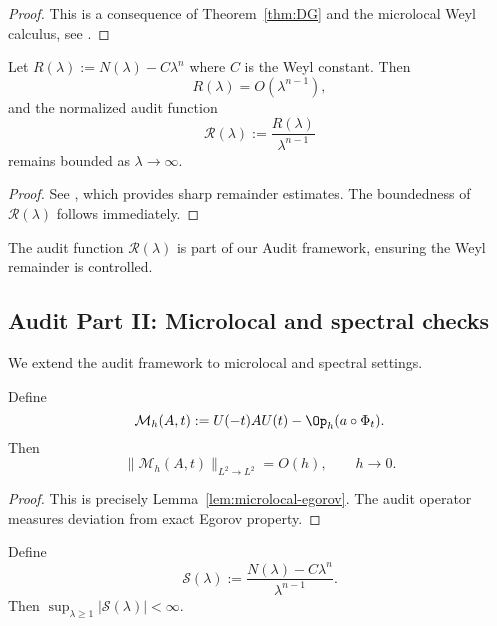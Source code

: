 \begin{proof}
This is a consequence of Theorem~\ref{thm:DG} and the microlocal Weyl calculus, see \cite{Ivrii}.
\end{proof}

\begin{lemma}
\label{lem:spectral-audit}
Let $R(\lambda) := N(\lambda) - C \lambda^n$ where $C$ is the Weyl constant. Then
\[
R(\lambda) = O(\lambda^{n-1}),
\]
and the normalized audit function
\[
\mathcal{R}(\lambda) := \frac{R(\lambda)}{\lambda^{n-1}}
\]
remains bounded as $\lambda \to \infty$.
\end{lemma}

\begin{proof}
See \cite{Ivrii}, which provides sharp remainder estimates. The boundedness of $\mathcal{R}(\lambda)$ follows immediately.
\end{proof}

\begin{remark}
The audit function $\mathcal{R}(\lambda)$ is part of our Audit framework, ensuring the Weyl remainder is controlled.
\end{remark}

\medskip

\subsection*{Audit Part II: Microlocal and spectral checks}
\label{appB:audit-II}

We extend the audit framework to microlocal and spectral settings.

\begin{proposition}
\label{prop:micro-audit}
Define
\[
\mathcal{M}_h(A,t) := U(-t)AU(t) - \Op_h(a \circ \Phi_t).
\]
Then
\[
\| \mathcal{M}_h(A,t) \|_{L^2 \to L^2} = O(h), \qquad h \to 0.
\]
\end{proposition}

\begin{proof}
This is precisely Lemma~\ref{lem:microlocal-egorov}. The audit operator measures deviation from exact Egorov property.
\end{proof}

\begin{proposition}
\label{prop:spectral-audit}
Define
\[
\mathcal{S}(\lambda) := \frac{N(\lambda) - C \lambda^n}{\lambda^{n-1}}.
\]
Then $\sup_{\lambda \geq 1} |\mathcal{S}(\lambda)| < \infty$.
\end{proposition}

